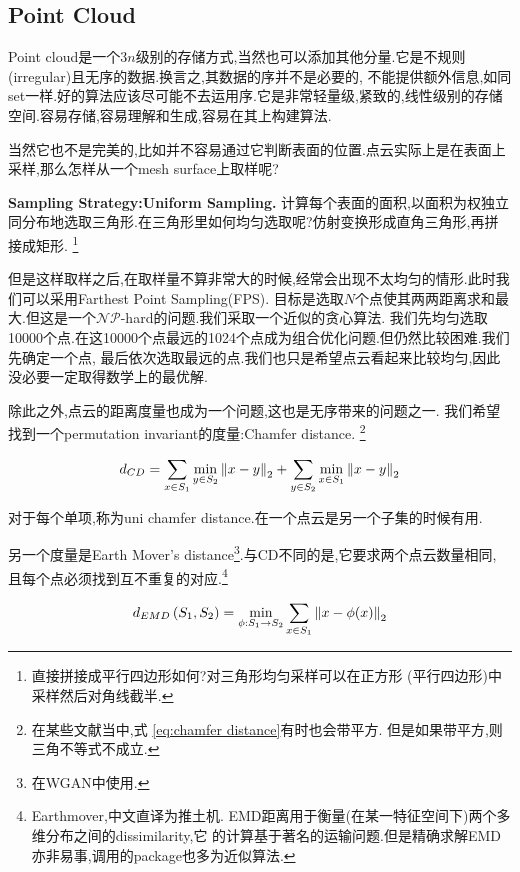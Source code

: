 \subsection{Point Cloud}

Point cloud是一个$3n$级别的存储方式,当然也可以添加其他分量.它是不规则(irregular)且无序的数据.换言之,其数据的序并不是必要的,
不能提供额外信息,如同set一样.好的算法应该尽可能不去运用序.它是非常轻量级,紧致的,线性级别的存储空间.容易存储,容易理解和生成,容易在其上构建算法.

当然它也不是完美的,比如并不容易通过它判断表面的位置.点云实际上是在表面上采样,那么怎样从一个mesh surface上取样呢?

\textbf{Sampling Strategy:Uniform Sampling.}
计算每个表面的面积,以面积为权独立同分布地选取三角形.在三角形里如何均匀选取呢?仿射变换形成直角三角形,再拼接成矩形.
\footnote{直接拼接成平行四边形如何?对三角形均匀采样可以在正方形 (平行四边形)中采样然后对角线截半.}

但是这样取样之后,在取样量不算非常大的时候,经常会出现不太均匀的情形.此时我们可以采用Farthest Point Sampling(FPS).
目标是选取$N$个点使其两两距离求和最大.但这是一个$\mathcal{NP}$-hard的问题.我们采取一个近似的贪心算法.
我们先均匀选取10000个点.在这10000个点最远的1024个点成为组合优化问题.但仍然比较困难.我们先确定一个点,
最后依次选取最远的点.我们也只是希望点云看起来比较均匀,因此没必要一定取得数学上的最优解.

除此之外,点云的距离度量也成为一个问题,这也是无序带来的问题之一.
我们希望找到一个permutation invariant的度量:Chamfer distance.
\footnote{在某些文献当中,式 \ref{eq:chamfer distance}有时也会带平方.
但是如果带平方,则三角不等式不成立.}

\begin{equation}
    d_{CD} = \sum_{x \in S_1} \min_{y \in S_2} \left \Vert x - y \right \Vert_{2} + \sum_{y \in S_2} \min_{x \in S_1} \left \Vert x - y \right \Vert_{2}
    \label{eq:chamfer distance}
\end{equation}

对于每个单项,称为uni chamfer distance.在一个点云是另一个子集的时候有用.

另一个度量是Earth Mover's distance\footnote{在WGAN中使用.}.与CD不同的是,它要求两个点云数量相同,
且每个点必须找到互不重复的对应.\footnote{Earthmover,中文直译为推土机.
EMD距离用于衡量(在某一特征空间下)两个多维分布之间的dissimilarity,它
的计算基于著名的运输问题.但是精确求解EMD亦非易事,调用的package也多为近似算法.}

\begin{equation}
    d_{E M D}\left(S_{1}, S_{2}\right)=\min _{\phi: S_{1} \rightarrow S_{2}} \sum_{x \in S_{1}} \left \Vert x-\phi(x) \right \Vert_{2}
\end{equation}

